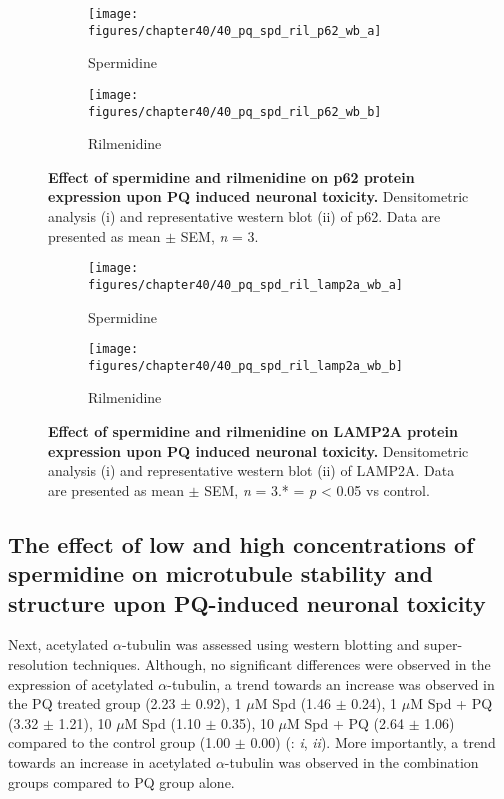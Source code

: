 \begin{figure}[!htbp]
  \center
  \begin{subfigure}[b]{0.495\linewidth}
    \texttt{[image: figures/chapter40/40\_pq\_spd\_ril\_p62\_wb\_a]}
    \caption{Spermidine}
  \end{subfigure}
  \begin{subfigure}[b]{0.495\linewidth}
    \texttt{[image: figures/chapter40/40\_pq\_spd\_ril\_p62\_wb\_b]}
    \caption{Rilmenidine}
  \end{subfigure}
  \caption[Effect of spermidine and rilmenidine on p62 protein expression upon PQ induced neuronal toxicity]{\textbf{Effect of spermidine and rilmenidine on p62 protein expression upon PQ induced neuronal toxicity.} Densitometric analysis (i) and representative western blot  (ii) of p62. Data are presented as mean $\pm$ SEM, \textit{n} = 3.}
  \label{fig:40_pq_spd_ril_p62_wb_a}
\end{figure}
  
\begin{figure}[!htbp]
  \center
  \begin{subfigure}[b]{0.495\linewidth}
    \texttt{[image: figures/chapter40/40\_pq\_spd\_ril\_lamp2a\_wb\_a]}
    \caption{Spermidine}
  \end{subfigure}
  \begin{subfigure}[b]{0.495\linewidth}
    \texttt{[image: figures/chapter40/40\_pq\_spd\_ril\_lamp2a\_wb\_b]}
    \caption{Rilmenidine}
  \end{subfigure}
  \caption[Effect of spermidine and rilmenidine on LAMP2A protein expression upon PQ induced neuronal toxicity]{\textbf{Effect of spermidine and rilmenidine on LAMP2A protein expression upon PQ induced neuronal toxicity.} Densitometric analysis (i) and representative western blot  (ii) of LAMP2A. Data are presented as mean $\pm$ SEM, \textit{n} = 3.* = \textit{p} < 0.05 vs control.}
  \label{fig:40_pq_spd_ril_lamp2a_wb_a}
\end{figure}

\subsection{The effect of low and high concentrations of spermidine on microtubule stability and structure upon PQ-induced neuronal toxicity}
Next, acetylated $\alpha$-tubulin was assessed using western blotting and super-resolution techniques. Although, no significant differences were observed in the expression of acetylated $\alpha$-tubulin, a trend towards an increase was observed in the PQ treated group (2.23 ± 0.92), 1 $\mu$M Spd (1.46 $\pm$ 0.24), 1 $\mu$M Spd + PQ (3.32 $\pm$ 1.21), 10 $\mu$M Spd (1.10 $\pm$ 0.35), 10 $\mu$M Spd + PQ (2.64 $\pm$ 1.06) compared to the control group (1.00 $\pm$ 0.00) (: \textit{i}, \textit{ii}). More importantly, a trend towards an increase in acetylated $\alpha$-tubulin was observed in the combination groups compared to PQ group alone. 

